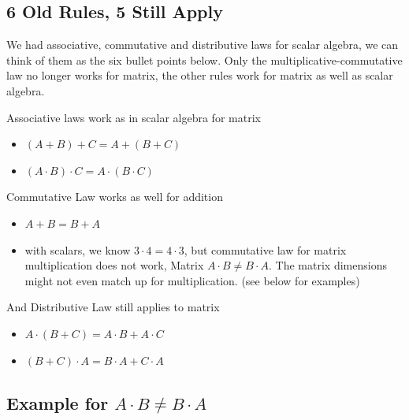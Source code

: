 \documentclass[
]{book}
\begin{document}
\hypertarget{old-rules-5-still-apply}{%
\subsection{6 Old Rules, 5 Still Apply}\label{old-rules-5-still-apply}}

We had associative, commutative and distributive laws for scalar
algebra, we can think of them as the six bullet points below. Only the
multiplicative-commutative law no longer works for matrix, the other
rules work for matrix as well as scalar algebra.

Associative laws work as in scalar algebra for matrix

\begin{itemize}
\item
  \(\displaystyle (A+B)+C=A+(B+C)\)
\item
  \(\displaystyle (A\cdot B)\cdot C=A\cdot (B\cdot C)\)
\end{itemize}

Commutative Law works as well for addition

\begin{itemize}
\item
  \(\displaystyle A+B=B+A\)
\item
  with scalars, we know \(3\cdot 4=4\cdot 3\), but commutative law for
  matrix multiplication does not work, Matrix
  \(A\cdot B\not= B\cdot A\). The matrix dimensions might not even match
  up for multiplication. (see below for examples)
\end{itemize}

And Distributive Law still applies to matrix

\begin{itemize}
\item
  \(\displaystyle A\cdot (B+C)=A\cdot B+A\cdot C\)
\item
  \(\displaystyle (B+C)\cdot A=B\cdot A+C\cdot A\)
\end{itemize}

\hypertarget{example-for-acdot-bnot-bcdot-a}{%
\subsection{\texorpdfstring{Example for \(A\cdot B\not= B\cdot A\)}{Example for A\textbackslash cdot B\textbackslash not= B\textbackslash cdot A}}\label{example-for-acdot-bnot-bcdot-a}}
\end{document}
